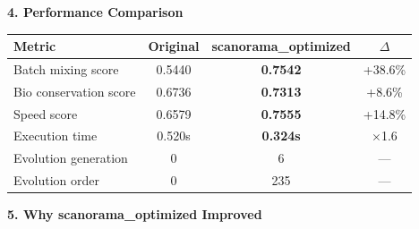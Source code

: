 \documentclass[8pt]{article}
\begin{document}
\vspace{6pt}

{\large\bfseries 4. Performance Comparison}

\vspace{3pt}

\renewcommand{\arraystretch}{1.25}
\begin{table}[ht]
\centering
\small
\begin{tabular}{@{}l c c c@{}}
\toprule
\textbf{Metric} & \textbf{Original} & \textbf{scanorama\_optimized} & \textbf{$\Delta$} \\
\midrule
Batch mixing score & 0.5440 & \textbf{0.7542} & +38.6\% \\
Bio conservation score & 0.6736 & \textbf{0.7313} & +8.6\% \\
Speed score & 0.6579 & \textbf{0.7555} & +14.8\% \\
Execution time & 0.520s & \textbf{0.324s} & $\times$1.6 \\
\addlinespace
Evolution generation & 0 & 6 & --- \\
Evolution order & 0 & 235 & --- \\
\bottomrule
\end{tabular}
\end{table}

\vspace{6pt}

{\large\bfseries 5. Why scanorama\_optimized Improved}

\vspace{3pt}
\end{document}

